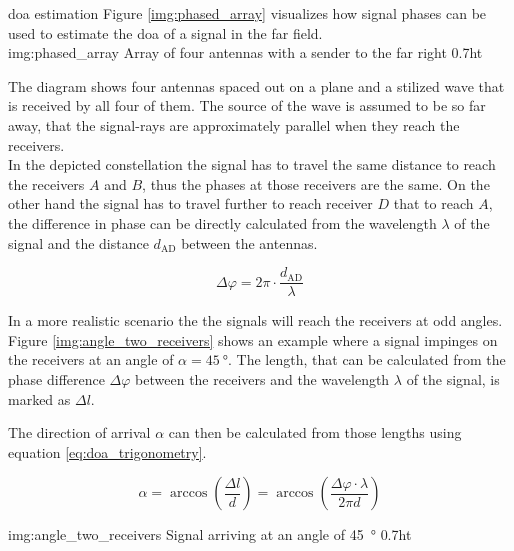 \begin{subchapter}{\gls{doa} estimation}
  Figure \ref{img:phased_array} visualizes how signal phases
  can be used to estimate the \acrlong{doa} of a signal
  in the far field. \\

               {img:phased_array}
               {Array of four antennas with a sender to the far right}
               {0.7}{ht}

  The diagram shows four antennas spaced out on a plane
  and a stilized wave that is received by all four of them.
  The source of the wave is assumed to be so far away, that
  the signal-rays are approximately parallel when
  they reach the receivers. \\

  In the depicted constellation the signal has to travel the
  same distance to reach the receivers $A$ and $B$, thus the
  phases at those receivers are the same.
  On the other hand the signal has to travel further to reach
  receiver $D$ that to reach $A$, the difference in phase can
  be directly calculated from the wavelength $\lambda$ of the
  signal and the distance $d_\text{AD}$ between the antennas.

  \begin{equation*}
    \Delta \varphi =  2 \pi \cdot \frac{d_\text{AD}}{\lambda}
  \end{equation*}

  In a more realistic scenario the the signals will reach the
  receivers at odd angles. Figure \ref{img:angle_two_receivers}
  shows an example where a signal impinges on the receivers at an
  angle of $\alpha=\SI{45}{\degree}$. The length, that can be calculated
  from the phase difference $\Delta \varphi$ between the receivers and
  the wavelength $\lambda$ of the signal, is marked as $\Delta l$.

  The direction of arrival $\alpha$ can then be calculated from
  those lengths using equation \ref{eq:doa_trigonometry}.

  \begin{equation}
    \label{eq:doa_trigonometry}
    \alpha
    = \arccos \left( \frac{\Delta l}{d} \right)
    = \arccos \left( \frac{\Delta \varphi \cdot \lambda}{2 \pi d} \right)
  \end{equation}

               {img:angle_two_receivers}
               {Signal arriving at an angle of \SI{45}{\degree}}
               {0.7}{ht}
\end{subchapter}

